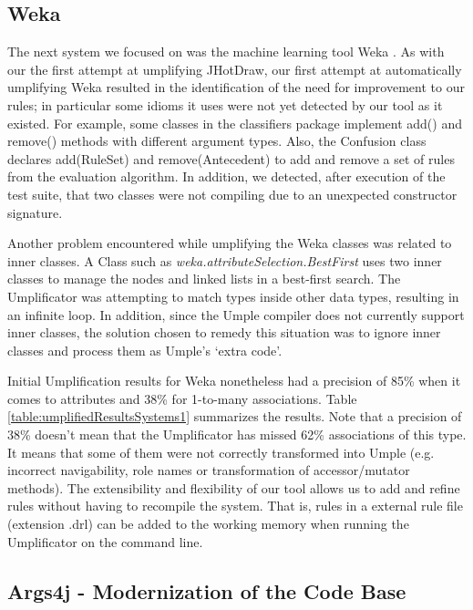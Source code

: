 \subsection{Weka}
 
The next system we focused on was the machine learning tool Weka \cite{Weka}. As with our the first attempt at umplifying JHotDraw, our first attempt at automatically umplifying Weka resulted in the identification of the need for improvement to our rules; in particular some idioms it uses were not yet detected by our tool as it existed. For example, some classes in the classifiers package implement add() and remove() methods with different argument types. Also, the Confusion class declares add(RuleSet) and remove(Antecedent) to add and remove a set of rules from the evaluation algorithm. In addition, we detected, after execution of the test suite, that two classes were not compiling due to an unexpected constructor signature.

Another problem encountered while umplifying the Weka classes was related to inner classes. A Class such as \textit{weka.attributeSelection.BestFirst} uses two inner classes to manage the nodes and linked lists in a best-first search. The Umplificator was attempting to match types inside other data types, resulting in an infinite loop. In addition, since the Umple compiler does not currently support inner classes, the solution chosen to remedy this situation was to ignore inner classes and process them as Umple's `extra code'. 

Initial Umplification results for Weka nonetheless had a precision of 85\% when it comes to attributes and 38\% for 1-to-many associations. Table \ref{table:umplifiedResultsSystems1} summarizes the results. Note that a precision of 38\% doesn't mean that the Umplificator has missed 62\% associations of this type. It means that some of them were not correctly transformed into Umple (e.g. incorrect navigability, role names or transformation of accessor/mutator methods). The extensibility and flexibility of our tool allows us to add and refine rules without having to recompile the system. That is, rules in a external rule file (extension .drl) can be added to the working memory when running the Umplificator on the command line.

\subsection{Args4j - Modernization of the Code Base}

